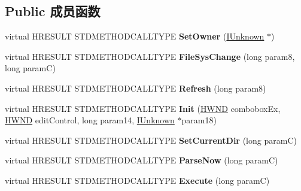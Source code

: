 \subsection*{Public 成员函数}
\begin{DoxyCompactItemize}
\item 
\mbox{\label{class_c_address_edit_box_a2a31e009e5232bea7dc8293d518704ce}} 
virtual H\+R\+E\+S\+U\+LT S\+T\+D\+M\+E\+T\+H\+O\+D\+C\+A\+L\+L\+T\+Y\+PE {\bfseries Set\+Owner} (\hyperlink{interface_i_unknown}{I\+Unknown} $\ast$)
\item 
\mbox{\label{class_c_address_edit_box_a0ef5758e8457e25de2282a6cea4b7b2d}} 
virtual H\+R\+E\+S\+U\+LT S\+T\+D\+M\+E\+T\+H\+O\+D\+C\+A\+L\+L\+T\+Y\+PE {\bfseries File\+Sys\+Change} (long param8, long paramC)
\item 
\mbox{\label{class_c_address_edit_box_afe90fa2d0faa7ff98cece50e28e5d72c}} 
virtual H\+R\+E\+S\+U\+LT S\+T\+D\+M\+E\+T\+H\+O\+D\+C\+A\+L\+L\+T\+Y\+PE {\bfseries Refresh} (long param8)
\item 
\mbox{\label{class_c_address_edit_box_af961d6b03d263c3cc3c623541055674d}} 
virtual H\+R\+E\+S\+U\+LT S\+T\+D\+M\+E\+T\+H\+O\+D\+C\+A\+L\+L\+T\+Y\+PE {\bfseries Init} (\hyperlink{interfacevoid}{H\+W\+ND} combobox\+Ex, \hyperlink{interfacevoid}{H\+W\+ND} edit\+Control, long param14, \hyperlink{interface_i_unknown}{I\+Unknown} $\ast$param18)
\item 
\mbox{\label{class_c_address_edit_box_a51985ca96ee968fdef79b646f02723a1}} 
virtual H\+R\+E\+S\+U\+LT S\+T\+D\+M\+E\+T\+H\+O\+D\+C\+A\+L\+L\+T\+Y\+PE {\bfseries Set\+Current\+Dir} (long paramC)
\item 
\mbox{\label{class_c_address_edit_box_a4a99b27722060e068df23d502f5b3997}} 
virtual H\+R\+E\+S\+U\+LT S\+T\+D\+M\+E\+T\+H\+O\+D\+C\+A\+L\+L\+T\+Y\+PE {\bfseries Parse\+Now} (long paramC)
\item 
\mbox{\label{class_c_address_edit_box_ad31fe3fdf75caa4e51209253447144b1}} 
virtual H\+R\+E\+S\+U\+LT S\+T\+D\+M\+E\+T\+H\+O\+D\+C\+A\+L\+L\+T\+Y\+PE {\bfseries Execute} (long paramC)

\end{DoxyCompactItemize}
